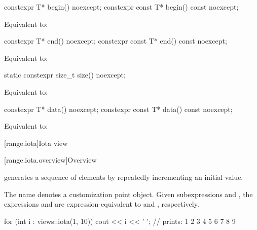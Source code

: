 %
\begin{itemdecl}
constexpr T* begin() noexcept;
constexpr const T* begin() const noexcept;
\end{itemdecl}

\begin{itemdescr}
\pnum
\effects
Equivalent to: 
\end{itemdescr}

%
\begin{itemdecl}
constexpr T* end() noexcept;
constexpr const T* end() const noexcept;
\end{itemdecl}

\begin{itemdescr}
\pnum
\effects
Equivalent to: 
\end{itemdescr}

%
\begin{itemdecl}
static constexpr size_t size() noexcept;
\end{itemdecl}

\begin{itemdescr}
\pnum
\effects
Equivalent to: 
\end{itemdescr}

%
\begin{itemdecl}
constexpr T* data() noexcept;
constexpr const T* data() const noexcept;
\end{itemdecl}

\begin{itemdescr}
\pnum
\effects
Equivalent to: 
\end{itemdescr}

[range.iota]{Iota view}

[range.iota.overview]{Overview}

\pnum
{} generates a
sequence of elements by repeatedly incrementing an initial value.

\pnum
{}%
The name  denotes a
customization point object.
Given subexpressions  and , the expressions
 and 
are expression-equivalent to
 and , respectively.

\pnum
\begin{example}
\begin{codeblock}
for (int i : views::iota(1, 10))
  cout << i << ' '; // prints: 1 2 3 4 5 6 7 8 9
\end{codeblock}
\end{example}

